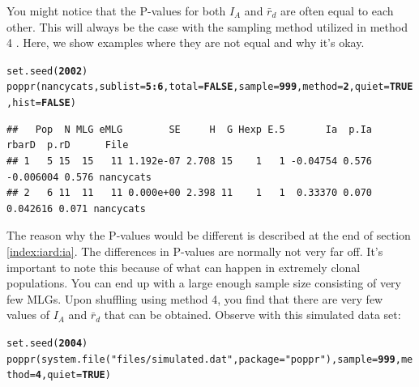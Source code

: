 \documentclass[letterpaper]{article}\usepackage[]{graphicx}\usepackage[]{color}
\makeatletter
\newcommand{\hlnum}[1]{\textcolor[rgb]{0.502,0,0.502}{\textbf{#1}}}%
\newcommand{\hlstr}[1]{\textcolor[rgb]{0.651,0.522,0}{#1}}%
\newcommand{\hlopt}[1]{\textcolor[rgb]{1,0,0.502}{\textbf{#1}}}%
\newcommand{\hlstd}[1]{\textcolor[rgb]{0,0,0}{#1}}%
\newcommand{\hlkwc}[1]{\textcolor[rgb]{0,0.502,0.753}{#1}}%
\newcommand{\hlkwd}[1]{\textcolor[rgb]{0,0.267,0.4}{#1}}%
\newenvironment{kframe}{%
 \def\at@end@of@kframe{}%
 \ifinner\ifhmode%
  \def\at@end@of@kframe{\end{minipage}}%
  \begin{minipage}{\columnwidth}%
 \fi\fi%
 \def\FrameCommand##1{\hskip\@totalleftmargin \hskip-\fboxsep
 \colorbox{shadecolor}{##1}\hskip-\fboxsep
     \hskip-\linewidth \hskip-\@totalleftmargin \hskip\columnwidth}%
 \MakeFramed {\advance\hsize-\width
   \@totalleftmargin\z@ \linewidth\hsize
   \@setminipage}}%
 {\par\unskip\endMakeFramed%
 \at@end@of@kframe}
\newenvironment{knitrout}{}{} %
\makeatother
\begin{document}
You might notice that the P-values for both $I_A$ and $\bar r_d$ are often equal to each other. This will always be the case with the sampling method utilized in method 4 \cite{Agapow:2001}. Here, we show examples where they are not equal and why it's okay.
\begin{knitrout}\footnotesize
{}\color{fgcolor}\begin{kframe}
\begin{alltt}
\hlkwd{set.seed}\hlstd{(}\hlnum{2002}\hlstd{)}
\hlkwd{poppr}\hlstd{(nancycats,} \hlkwc{sublist} \hlstd{=} \hlnum{5}\hlopt{:}\hlnum{6}\hlstd{,} \hlkwc{total} \hlstd{=} \hlnum{FALSE}\hlstd{,} \hlkwc{sample} \hlstd{=} \hlnum{999}\hlstd{,} \hlkwc{method} \hlstd{=} \hlnum{2}\hlstd{,} \hlkwc{quiet} \hlstd{=} \hlnum{TRUE}\hlstd{,} \hlkwc{hist} \hlstd{=} \hlnum{FALSE}\hlstd{)}
\end{alltt}
\end{kframe}
\end{knitrout}

\begin{knitrout}\footnotesize
{}\color{fgcolor}\begin{kframe}
\begin{verbatim}
##   Pop  N MLG eMLG        SE     H  G Hexp E.5       Ia  p.Ia     rbarD  p.rD      File
## 1   5 15  15   11 1.192e-07 2.708 15    1   1 -0.04754 0.576 -0.006004 0.576 nancycats
## 2   6 11  11   11 0.000e+00 2.398 11    1   1  0.33370 0.070  0.042616 0.071 nancycats
\end{verbatim}
\end{kframe}
\end{knitrout}

The reason why the P-values would be different is described at the end of section \ref{index:iard:ia}. The differences in P-values are normally not very far off. It's important to note this because of what can happen in extremely clonal populations. You can end up with a large enough sample size consisting of very few MLGs. Upon shuffling using method 4, you find that there are very few values of $I_A$ and $\bar r_d$ that can be obtained. Observe with this simulated data set:
\begin{knitrout}\footnotesize
{}\color{fgcolor}\begin{kframe}
\begin{alltt}
\hlkwd{set.seed}\hlstd{(}\hlnum{2004}\hlstd{)}
\hlkwd{poppr}\hlstd{(}\hlkwd{system.file}\hlstd{(}\hlstr{"files/simulated.dat"}\hlstd{,} \hlkwc{package} \hlstd{=} \hlstr{"poppr"}\hlstd{),} \hlkwc{sample} \hlstd{=} \hlnum{999}\hlstd{,} \hlkwc{method} \hlstd{=} \hlnum{4}\hlstd{,} \hlkwc{quiet} \hlstd{=} \hlnum{TRUE}\hlstd{)}
\end{alltt}
\end{kframe}
\end{knitrout}
\end{document}
